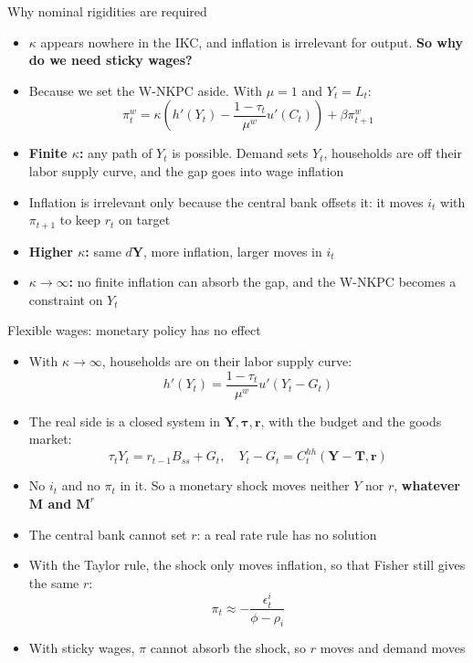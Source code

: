 \documentclass[10pt,english]{beamer}
\begin{document}
\begin{frame}{Why nominal rigidities are required}
\begin{itemize}
\item <+->$\kappa$ appears nowhere in the IKC, and inflation is irrelevant for output. \textbf{So why do we need sticky wages?}
\item <+->Because we set the W-NKPC aside. With $\mu=1$ and $Y_{t}=L_{t}$:
\[
\pi_{t}^{w}=\kappa\left(h'\left(Y_{t}\right)-\frac{1-\tau_{t}}{\mu^{w}}u'\left(C_{t}\right)\right)+\beta\pi_{t+1}^{w}
\]
\item <+->\textbf{Finite $\kappa$:} any path of $Y_{t}$ is possible. Demand sets $Y_{t}$, households are off their labor supply curve, and the gap goes into wage inflation
\item <+->Inflation is irrelevant only because the central bank offsets it: it moves $i_{t}$ with $\pi_{t+1}$ to keep $r_{t}$ on target
\item <+->\textbf{Higher $\kappa$:} same $d\boldsymbol{Y}$, more inflation, larger moves in $i_{t}$
\item <+->\textbf{$\kappa\rightarrow\infty$:} no finite inflation can absorb the gap, and the W-NKPC becomes a constraint on $Y_{t}$
\end{itemize}
\end{frame}
%
\begin{frame}{Flexible wages: monetary policy has no effect}
\vspace{-1mm}
\begin{itemize}
\item <+->With $\kappa\rightarrow\infty$, households are on their labor supply curve:
\[
h'\left(Y_{t}\right)=\frac{1-\tau_{t}}{\mu^{w}}u'\left(Y_{t}-G_{t}\right)
\]
\item <+->The real side is a closed system in $\boldsymbol{Y},\boldsymbol{\tau},\boldsymbol{r}$, with the budget and the goods market:
\[
\tau_{t}Y_{t}=r_{t-1}B_{ss}+G_{t},\quad Y_{t}-G_{t}=C_{t}^{hh}\left(\boldsymbol{Y}-\boldsymbol{T},\boldsymbol{r}\right)
\]
\item <+->No $i_{t}$ and no $\pi_{t}$ in it. So a monetary shock moves neither $Y$ nor $r$, \textbf{whatever $\boldsymbol{M}$ and $\boldsymbol{M}^{r}$}
\item <+->The central bank cannot set $r$: a real rate rule has no solution
\item <+->With the Taylor rule, the shock only moves inflation, so that Fisher still gives the same $r$:
\[
\pi_{t}\approx-\frac{\epsilon_{t}^{i}}{\phi-\rho_{i}}
\]
\item <+->With sticky wages, $\pi$ cannot absorb the shock, so $r$ moves and demand moves
\end{itemize}
\end{frame}
%
\end{document}
